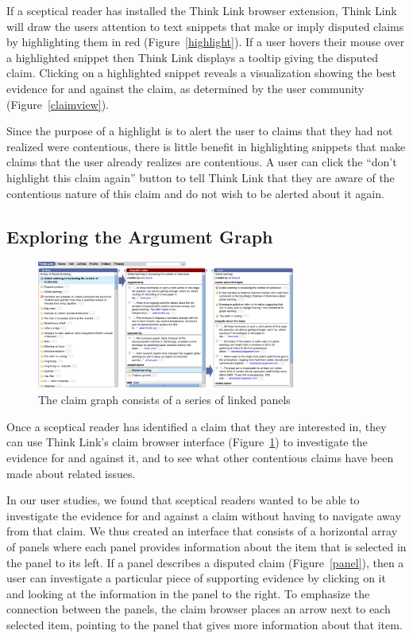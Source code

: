 \documentclass{chi2009}
\newcommand{\todo}[1]{}
\begin{document}
If a sceptical reader has installed the Think Link browser extension, Think Link will draw the users attention to text snippets that make or imply disputed claims by highlighting them in red (Figure~\ref{highlight}). If a user hovers their mouse over a highlighted snippet then Think Link displays a tooltip giving the disputed claim. Clicking on a highlighted snippet reveals a visualization showing the best evidence for and against the claim, as determined by the user community (Figure~\ref{claimview}).

Since the purpose of a highlight is to alert the user to claims that they had not realized were contentious, there is little benefit in highlighting snippets that make claims that the user already realizes are contentious. A user can click the ``don't highlight this claim again'' button to tell Think Link that they are aware of the contentious nature of this claim and do not wish to be alerted about it again.

\todo{ignore button}
\todo{talk about the margin?}

\subsection{Exploring the Argument Graph}

\begin{figure}[tb]
	\begin{center}
	\includegraphics[width=8.5cm]{../screenshots/v2_panels.png}
	\caption{The claim graph consists of a series of linked panels}
	\label{panels}
	\end{center}
\end{figure}

Once a sceptical reader has identified a claim that they are interested in, they can use Think Link's claim browser interface (Figure~\ref{panels}) to investigate the evidence for and against it, and to see what other contentious claims have been made about related issues. 

In our user studies, we found that sceptical readers wanted to be able to investigate the evidence for and against a claim without having to navigate away from that claim. We thus created an interface that consists of a horizontal array of panels where each panel provides information about the item that is selected in the panel to its left. If a panel describes a disputed claim (Figure~\ref{panel}), then a user can investigate a particular piece of supporting evidence by clicking on it and looking at the information in the panel to the right. 
To emphasize the connection between the panels, the claim browser places an arrow next to each selected item, pointing to the panel that gives more information about that item.
\end{document}
